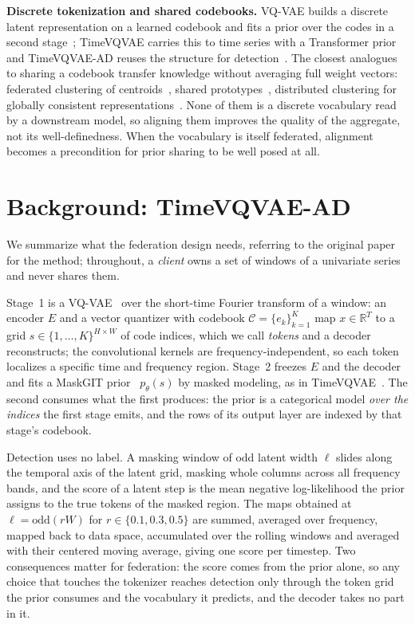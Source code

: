 \documentclass[conference]{IEEEtran}
\begin{document}
\textbf{Discrete tokenization and shared codebooks.} VQ-VAE builds a discrete latent representation
on a learned codebook and fits a prior over the codes in a second stage~\cite{van2017neural};
TimeVQVAE carries this to time series with a Transformer prior~\cite{lee2023timevqvae} and
TimeVQVAE-AD reuses the structure for detection~\cite{lee2024timevqvaead}. The closest analogues to
sharing a codebook transfer knowledge without averaging full weight vectors: federated clustering
of centroids~\cite{dennis2021kfed}, shared prototypes~\cite{tan2022fedproto}, distributed
clustering for globally consistent representations~\cite{lubana2022orchestra}. None of them is a
discrete vocabulary read by a downstream model, so aligning them improves the quality of the
aggregate, not its well-definedness. When the vocabulary is itself federated, alignment becomes a
precondition for prior sharing to be well posed at all.

\section{Background: TimeVQVAE-AD}
\label{sec:background}

We summarize what the federation design needs, referring to the original
paper~\cite{lee2024timevqvaead} for the method; throughout, a \emph{client} owns a set of windows
of a univariate series and never shares them.

Stage~1 is a VQ-VAE~\cite{van2017neural} over the short-time Fourier transform of a window: an
encoder $E$ and a vector quantizer with codebook $\mathcal{C}=\{e_k\}_{k=1}^{K}$ map
$x\in\mathbb{R}^{T}$ to a grid $s\in\{1,\dots,K\}^{H\times W}$ of code indices, which we call
\emph{tokens} and a decoder reconstructs; the convolutional kernels are frequency-independent, so
each token localizes a specific time and frequency region. Stage~2 freezes $E$ and the decoder and
fits a MaskGIT prior~\cite{chang2022maskgit} $p_\theta(s)$ by masked modeling, as in
TimeVQVAE~\cite{lee2023timevqvae}. The second consumes what the first produces: the prior is a
categorical model \emph{over the indices} the first stage emits, and the rows of its output layer
are indexed by that stage's codebook.

Detection uses no label. A masking window of odd latent width $\ell$ slides along the temporal
axis of the latent grid, masking whole columns across all frequency bands, and the score of a
latent step is the mean negative log-likelihood the prior assigns to the true tokens of the masked
region. The maps obtained at $\ell=\mathrm{odd}(rW)$ for $r\in\{0.1,0.3,0.5\}$ are summed,
averaged over frequency, mapped back to data space, accumulated over the rolling windows and
averaged with their centered moving average, giving one score per timestep. Two consequences matter
for federation: the score comes from the prior alone, so any choice that touches the tokenizer
reaches detection only through the token grid the prior consumes and the vocabulary it predicts,
and the decoder takes no part in it.
\end{document}

